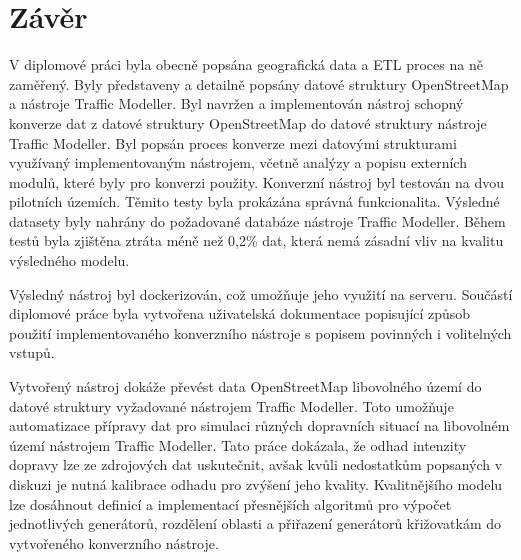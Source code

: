 \chapter{Závěr}

V diplomové práci byla obecně popsána geografická data a ETL proces na ně zaměřený. Byly představeny a detailně popsány datové struktury OpenStreetMap a nástroje Traffic Modeller. Byl navržen a implementován nástroj schopný konverze dat z datové struktury OpenStreetMap do datové struktury nástroje Traffic Modeller. Byl popsán proces konverze mezi datovými strukturami využívaný implementovaným nástrojem, včetně analýzy a popisu externích modulů, které byly pro konverzi použity. Konverzní nástroj byl testován na dvou pilotních územích. Těmito testy byla prokázána správná funkcionalita. Výsledné datasety byly nahrány do požadované databáze nástroje Traffic Modeller. Během testů byla zjištěna ztráta méně než 0,2\% dat, která nemá zásadní vliv na kvalitu výsledného modelu.

Výsledný nástroj byl dockerizován, což umožňuje jeho využití na serveru. Součástí diplomové práce byla vytvořena uživatelská dokumentace popisující způsob použití implementovaného konverzního nástroje s popisem povinných i volitelných vstupů.

Vytvořený nástroj dokáže převést data OpenStreetMap libovolného území do datové struktury vyžadované nástrojem Traffic Modeller. Toto umožňuje automatizace přípravy dat pro simulaci různých dopravních situací na libovolném území nástrojem Traffic Modeller. Tato práce dokázala, že odhad intenzity dopravy lze ze zdrojových dat uskutečnit, avšak kvůli nedostatkům popsaných v diskuzi je nutná kalibrace odhadu pro zvýšení jeho kvality. Kvalitnějšího modelu lze dosáhnout definicí a implementací přesnějších algoritmů pro výpočet jednotlivých generátorů, rozdělení oblasti a přiřazení generátorů křižovatkám do vytvořeného konverzního nástroje.



